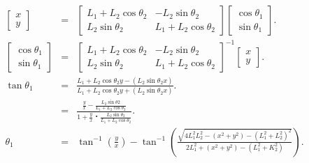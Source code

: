 \documentclass[10pt,a4j]{jsarticle}
\begin{document}
      \begin{eqnarray}
        \left[
          \begin{array}{c}
            x \\
            y
          \end{array}
        \right] &=& \left[
                        \begin{array}{cc}
                          L_{1} + L_{2}\cos\theta_{2} & -L_{2}\sin\theta_{2} \\
                          L_{2}\sin\theta_{2} & L_{1} + L_{2}\cos\theta_{2}
                        \end{array}
                      \right] 
                        \left[
                          \begin{array}{c}
                              \cos\theta_{1} \\
                              \sin\theta_{1}
                          \end{array}
                        \right]. \\
        \left[
          \begin{array}{c}
            \cos\theta_{1} \\
            \sin\theta_{1}
          \end{array}
        \right] &=& \left[
                        \begin{array}{cc}
                          L_{1} + L_{2}\cos\theta_{2} & -L_{2}\sin\theta_{2} \\
                          L_{2}\sin\theta_{2} & L_{1} + L_{2}\cos\theta_{2}
                        \end{array}
                      \right]^{-1}
                        \left[
                          \begin{array}{c}
                              x \\
                              y
                          \end{array}
                        \right]. \\
        \tan\theta_{1} &=& \frac{L_{1} + L_{2}\cos\theta_{2}y - (L_{2}\sin\theta_{2}x)}{L_{1} + L_{2}\cos\theta_{2}y + (L_{2}\sin\theta_{2}x)}. \nonumber \\
        &=& \frac{\frac{y}{x} - \frac{L_{2}\sin\theta{2}}{L_{1} + L_{2}\cos\theta_{2}}}{1 + \frac{y}{x}・\frac{L_{2}\sin\theta_{2}}{L_{1} + L_{2}\cos\theta_{2}}}. \\
        \theta_{1} &=& \tan^{-1}\left(\frac{y}{x}\right) - \tan^{-1}\left(\frac{\sqrt{4L_{1}^{2}L_{2}^{2} - {(x^{2} + y^{2}) - (L_{1}^{2} + L_{2}^{2})}^{2}}}{2L_{1}^{2} + (x^{2} + y^{2}) - (L_{1}^2 + K_{2}^2)     }\right).
      \end{eqnarray}
\end{document}
